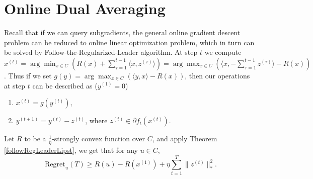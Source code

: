 \documentclass[openany]{book}
\theoremstyle{definition}
\theoremstyle{remark}
\begin{document}
\section{Online Dual Averaging}
Recall that if we can query subgradients, the general online gradient descent problem can be reduced to online linear optimization problem, which in turn can be solved by Follow-the-Regularized-Leader algorithm. At step $t$ we compute $x^{(t)}=\arg\min_{x\in C}(R(x)+\sum_{\tau=1}^{t-1}\langle x,z^{(\tau)}\rangle)=\arg\max_{x\in C}(\langle x,-\sum_{\tau=1}^{t-1}z^{(\tau)}\rangle-R(x))$. Thus if we set $g(y)=\arg\max_{x\in C}(\langle y,x\rangle-R(x))$, then our operations at step $t$ can be described as ($y^{(1)}=0$)
\begin{enumerate}
    \item $x^{(t)}=g(y^{(t)})$,
    \item $y^{(t+1)}=y^{(t)}-z^{(t)}$, where $z^{(t)}\in\partial f_t(x^{(t)})$.
\end{enumerate}

Let $R$ to be a $\frac{1}{\eta}$-strongly convex function over $C$, and apply Theorem \ref{followRegLeaderLipst}, we get that for any $u\in C$,
\begin{equation}
    \mathrm{Regret}_u(T)\ge R(u)-R(x^{(1)})+\eta \sum_{t=1}^{T}\|z^{(t)}\|_*^2.
\end{equation}
\end{document}
